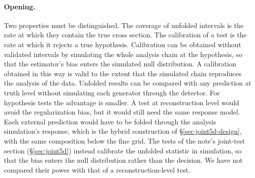 \paragraph{Opening.} Two properties must be distinguished.  The coverage of unfolded intervals is the rate at which they contain the true cross section.  The calibration of a test is the rate at which it rejects a true hypothesis.  Calibration can be obtained without validated intervals by simulating the whole analysis chain at the hypothesis, so that the estimator's bias enters the simulated null distribution.  A calibration obtained in this way is valid to the extent that the simulated chain reproduces the analysis of the data.  Unfolded results can be compared with any prediction at truth level without simulating each generator through the detector. For hypothesis tests the advantage is smaller.  A test at reconstruction level would avoid the regularization bias, but it would still need the same response model.  Each external prediction would have to be folded through the analysis simulation's response, which is the hybrid construction of \S\ref{sec:joint5d-design}, with the same composition below the fine grid.  The tests of the note's joint-test section (\S\ref{sec:joint5d}) instead calibrate the unfolded statistic in simulation, so that the bias enters the null distribution rather than the decision.  We have not compared their power with that of a reconstruction-level test.

